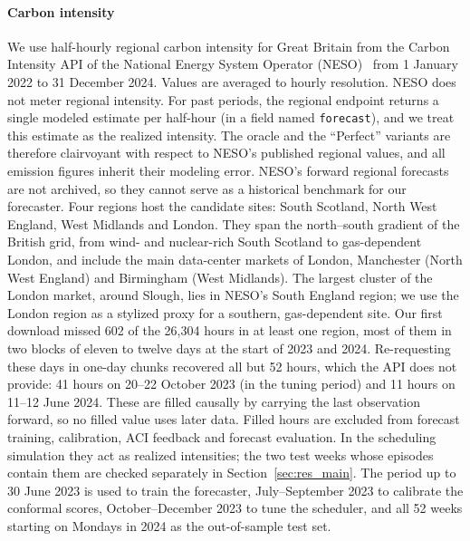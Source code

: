 \paragraph{Carbon intensity} We use half-hourly regional carbon intensity for Great Britain from the Carbon Intensity API of the National Energy System Operator (NESO)~\cite{nesoapi} from 1 January 2022 to 31 December 2024. Values are averaged to hourly resolution. NESO does not meter regional intensity. For past periods, the regional endpoint returns a single modeled estimate per half-hour (in a field named \texttt{forecast}), and we treat this estimate as the realized intensity. The oracle and the ``Perfect'' variants are therefore clairvoyant with respect to NESO's published regional values, and all emission figures inherit their modeling error. NESO's forward regional forecasts are not archived, so they cannot serve as a historical benchmark for our forecaster. Four regions host the candidate sites: South Scotland, North West England, West Midlands and London. They span the north--south gradient of the British grid, from wind- and nuclear-rich South Scotland to gas-dependent London, and include the main data-center markets of London, Manchester (North West England) and Birmingham (West Midlands). The largest cluster of the London market, around Slough, lies in NESO's South England region; we use the London region as a stylized proxy for a southern, gas-dependent site. Our first download missed 602 of the 26{,}304 hours in at least one region, most of them in two blocks of eleven to twelve days at the start of 2023 and 2024. Re-requesting these days in one-day chunks recovered all but 52 hours, which the API does not provide: 41 hours on 20--22 October 2023 (in the tuning period) and 11 hours on 11--12 June 2024. These are filled causally by carrying the last observation forward, so no filled value uses later data. Filled hours are excluded from forecast training, calibration, ACI feedback and forecast evaluation. In the scheduling simulation they act as realized intensities; the two test weeks whose episodes contain them are checked separately in Section~\ref{sec:res_main}. The period up to 30 June 2023 is used to train the forecaster, July--September 2023 to calibrate the conformal scores, October--December 2023 to tune the scheduler, and all 52 weeks starting on Mondays in 2024 as the out-of-sample test set.

